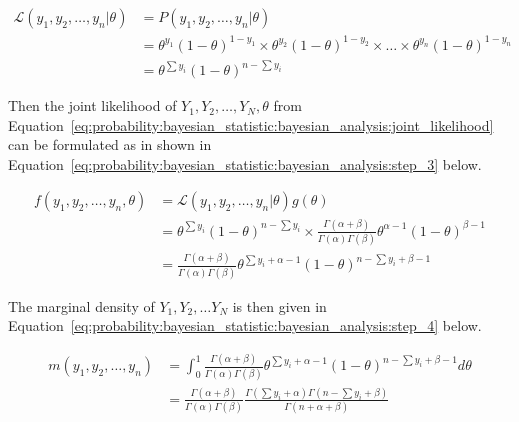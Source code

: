 \begin{equation}
      \label{eq:probability:bayesian_statistic:bayesian_analysis:step_2}
      \begin{split}
            \mathcal{L}(y_{1}, y_{2}, \dots, y_{n} \vert \theta)
            &= P(y_{1}, y_{2}, \dots, y_{n} \vert \theta)\\
            &= \theta^{y_{1}}(1-\theta)^{1 - y_{1}} \times \theta^{y_{2}}(1-\theta)^{1 - y_{2}} \times \dots \times \theta^{y_{n}}(1-\theta)^{1 - y_{n}}\\
            &= \theta^{\sum y_{i}}(1-\theta)^{n-\sum y_{i}}
      \end{split}
\end{equation}

Then the joint likelihood of $Y_{1}, Y_{2}, \dots, Y_{N}, \theta$ from Equation~\eqref{eq:probability:bayesian_statistic:bayesian_analysis:joint_likelihood} can be formulated as in shown in Equation~\eqref{eq:probability:bayesian_statistic:bayesian_analysis:step_3} below.

\begin{equation}
      \label{eq:probability:bayesian_statistic:bayesian_analysis:step_3}
      \begin{split}
            f(y_{1}, y_{2}, \dots, y_{n}, \theta)
            &= \mathcal{L}(y_{1}, y_{2}, \dots, y_{n} \vert \theta)g(\theta)\\
            &= \theta^{\sum y_{i}}(1-\theta)^{n-\sum y_{i}} \times \frac{\Gamma(\alpha + \beta)}{\Gamma(\alpha)\Gamma(\beta)}\theta^{\alpha - 1}(1 - \theta)^{\beta  - 1}\\
            &= \frac{\Gamma(\alpha + \beta)}{\Gamma(\alpha)\Gamma(\beta)}\theta^{\sum y_{i} + \alpha - 1}(1-\theta)^{n - \sum y_{i} + \beta - 1}
      \end{split}
\end{equation}

The marginal density of $Y_{1}, Y_{2}, \dots Y_{N}$ is then given in Equation~\eqref{eq:probability:bayesian_statistic:bayesian_analysis:step_4} below.

\begin{equation}
      \label{eq:probability:bayesian_statistic:bayesian_analysis:step_4}
      \begin{split}
            m(y_{1}, y_{2}, \dots, y_{n})
            &= \int_{0}^{1}\frac{\Gamma(\alpha + \beta)}{\Gamma(\alpha)\Gamma(\beta)}\theta^{\sum y_{i} + \alpha - 1}(1-\theta)^{n - \sum y_{i} + \beta - 1}d\theta\\
            &= \frac{\Gamma(\alpha + \beta)}{\Gamma(\alpha)\Gamma(\beta)}\frac{\Gamma(\sum y_{i} + \alpha)\Gamma(n - \sum y_{i} + \beta)}{\Gamma(n + \alpha + \beta)}
      \end{split}
\end{equation}


